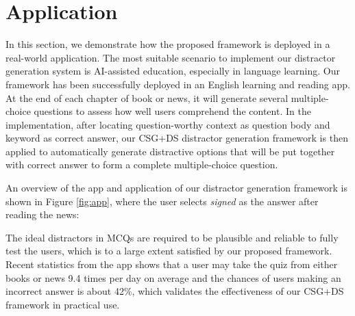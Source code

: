 \documentclass[11pt,a4paper]{article}
\newcommand{\KZ}[1]{\textcolor{blue}{Kenny: #1}}
\newcommand{\figref}[1]{Figure \ref{#1}}
\begin{document}
\section{Application}
\begin{figure*}[ht!]
	\centering
	\caption{The mobile app in which the proposed distractor generation framework is 
		deployed. 
		The right-most screenshot shows one generated MCQ given the news context in 
		the previous screenshot.}
	\label{fig:app}
\end{figure*}
In this section, we demonstrate how the proposed framework is deployed in a real-world application. The  most suitable scenario to implement our distractor generation system is AI-assisted education, especially in language learning. Our framework has been successfully deployed in an English learning and reading app. At the end of each chapter of book or news, it will generate 
several multiple-choice questions to assess how well users comprehend the content. 
In the implementation, after locating question-worthy context as question body and keyword as 
correct answer, our CSG+DS distractor generation framework is then applied to 
automatically generate distractive options that will be put together with correct answer 
to form a complete multiple-choice question.

An overview of the app and application of our 
distractor generation framework is shown in \figref{fig:app}, where the user 
selects \textit{signed} as the answer after reading the news:

The ideal distractors in MCQs are required to be plausible and reliable to fully test 
the users, which is to a large extent satisfied by our proposed framework. Recent statistics from the app shows that a user may take the quiz from either books or news 9.4 times per day on average and the chances of users making an incorrect
answer is about 42\%, which validates the effectiveness of our CSG+DS 
framework in practical use.



\end{document}
